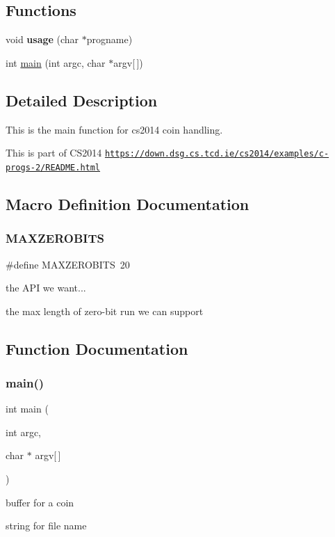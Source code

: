 \subsection*{Functions}
\begin{DoxyCompactItemize}
\item 
\mbox{\label{cs2014coin-main_8c_a9a05fb05f758a87628212c4bfc50c182}} 
void {\bfseries usage} (char $\ast$progname)
\item 
int \hyperlink{cs2014coin-main_8c_a0ddf1224851353fc92bfbff6f499fa97}{main} (int argc, char $\ast$argv\mbox{[}$\,$\mbox{]})
\end{DoxyCompactItemize}


\subsection{Detailed Description}
This is the main function for cs2014 coin handling. 

This is part of C\+S2014 \href{https://down.dsg.cs.tcd.ie/cs2014/examples/c-progs-2/README.html}{\tt https\+://down.\+dsg.\+cs.\+tcd.\+ie/cs2014/examples/c-\/progs-\/2/\+R\+E\+A\+D\+M\+E.\+html} 

\subsection{Macro Definition Documentation}
\mbox{\label{cs2014coin-main_8c_a27a1bcd135235e6fd1b52af23cb7886a}} 
\subsubsection{\texorpdfstring{M\+A\+X\+Z\+E\+R\+O\+B\+I\+TS}{MAXZEROBITS}}
{\footnotesize\ttfamily \#define M\+A\+X\+Z\+E\+R\+O\+B\+I\+TS~20}



the A\+PI we want... 

the max length of zero-\/bit run we can support 

\subsection{Function Documentation}
\mbox{\label{cs2014coin-main_8c_a0ddf1224851353fc92bfbff6f499fa97}} 
\subsubsection{\texorpdfstring{main()}{main()}}
{\footnotesize\ttfamily int main (\begin{DoxyParamCaption}\item[{int}]{argc,  }\item[{char $\ast$}]{argv\mbox{[}$\,$\mbox{]} }\end{DoxyParamCaption})}

buffer for a coin

string for file name 